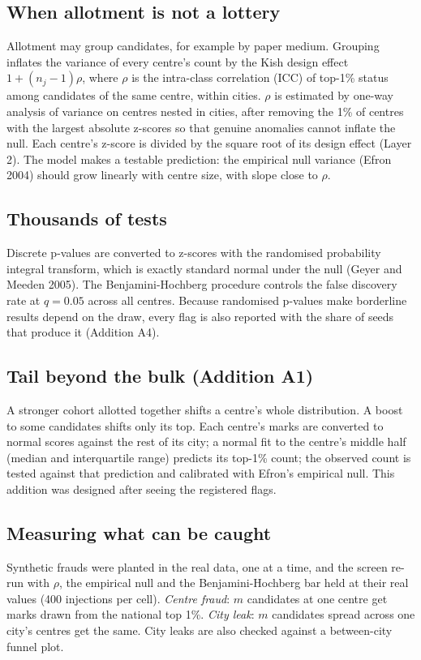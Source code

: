 \documentclass[11pt]{article}
\begin{document}
\subsection{When allotment is not a lottery}
Allotment may group candidates, for example by paper medium. Grouping inflates the variance of every centre's count by the Kish design effect $1 + (n_j - 1)\rho$, where $\rho$ is the intra-class correlation (ICC) of top-1\% status among candidates of the same centre, within cities. $\rho$ is estimated by one-way analysis of variance on centres nested in cities, after removing the 1\% of centres with the largest absolute z-scores so that genuine anomalies cannot inflate the null. Each centre's z-score is divided by the square root of its design effect (Layer 2). The model makes a testable prediction: the empirical null variance (Efron 2004) should grow linearly with centre size, with slope close to $\rho$.

\subsection{Thousands of tests}
Discrete p-values are converted to z-scores with the randomised probability integral transform, which is exactly standard normal under the null (Geyer and Meeden 2005). The Benjamini-Hochberg procedure controls the false discovery rate at $q = 0.05$ across all centres. Because randomised p-values make borderline results depend on the draw, every flag is also reported with the share of \StabSeeds{} seeds that produce it (Addition A4).

\subsection{Tail beyond the bulk (Addition A1)}
A stronger cohort allotted together shifts a centre's whole distribution. A boost to some candidates shifts only its top. Each centre's marks are converted to normal scores against the rest of its city; a normal fit to the centre's middle half (median and interquartile range) predicts its top-1\% count; the observed count is tested against that prediction and calibrated with Efron's empirical null. This addition was designed after seeing the registered flags.

\subsection{Measuring what can be caught}
Synthetic frauds were planted in the real data, one at a time, and the screen re-run with $\rho$, the empirical null and the Benjamini-Hochberg bar held at their real values (400 injections per cell). \textit{Centre fraud}: $m$ candidates at one centre get marks drawn from the national top 1\%. \textit{City leak}: $m$ candidates spread across one city's centres get the same. City leaks are also checked against a between-city funnel plot.
\end{document}
